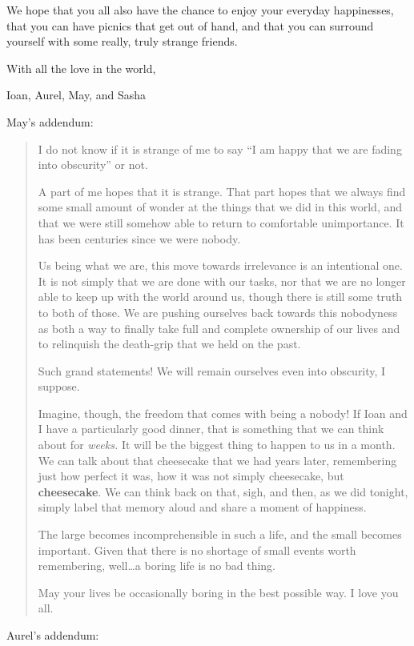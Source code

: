 We hope that you all also have the chance to enjoy your everyday happinesses, that you can have picnics that get out of hand, and that you can surround yourself with some really, truly strange friends.

With all the love in the world,

Ioan, Aurel, May, and Sasha

May's addendum:

\begin{quote}
I do not know if it is strange of me to say ``I am happy that we are fading into obscurity'' or not.

A part of me hopes that it is strange. That part hopes that we always find some small amount of wonder at the things that we did in this world, and that we were still somehow able to return to comfortable unimportance. It has been centuries since we were nobody.

Us being what we are, this move towards irrelevance is an intentional one. It is not simply that we are done with our tasks, nor that we are no longer able to keep up with the world around us, though there is still some truth to both of those. We are pushing ourselves back towards this nobodyness as both a way to finally take full and complete ownership of our lives and to relinquish the death-grip that we held on the past.

Such grand statements! We will remain ourselves even into obscurity, I suppose.

Imagine, though, the freedom that comes with being a nobody! If Ioan and I have a particularly good dinner, that is something that we can think about for \emph{weeks.} It will be the biggest thing to happen to us in a month. We can talk about that cheesecake that we had years later, remembering just how perfect it was, how it was not simply cheesecake, but \textbf{cheesecake}. We can think back on that, sigh, and then, as we did tonight, simply label that memory aloud and share a moment of happiness.

The large becomes incomprehensible in such a life, and the small becomes important. Given that there is no shortage of small events worth remembering, well\ldots a boring life is no bad thing.

May your lives be occasionally boring in the best possible way. I love you all.
\end{quote}

Aurel's addendum:

